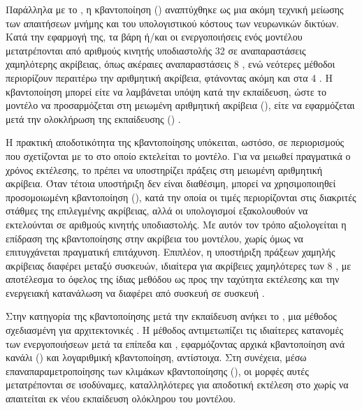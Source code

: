 Παράλληλα με το , η κβαντοποίηση
() αναπτύχθηκε ως μια ακόμη τεχνική μείωσης των
απαιτήσεων μνήμης και του υπολογιστικού κόστους των νευρωνικών δικτύων.
Κατά την εφαρμογή της, τα βάρη ή/και οι ενεργοποιήσεις ενός μοντέλου
μετατρέπονται από αριθμούς κινητής υποδιαστολής 32  σε
αναπαραστάσεις χαμηλότερης ακρίβειας, όπως ακέραιες αναπαραστάσεις
8  \cite{jacob2018quantization}, ενώ νεότερες μέθοδοι
περιορίζουν περαιτέρω την αριθμητική ακρίβεια, φτάνοντας ακόμη και στα
4  \cite{li2023repqvit}. Η κβαντοποίηση μπορεί είτε να λαμβάνεται υπόψη κατά την εκπαίδευση,
ώστε το μοντέλο να προσαρμόζεται στη μειωμένη αριθμητική ακρίβεια
(), είτε να εφαρμόζεται μετά την
ολοκλήρωση της εκπαίδευσης ()
\cite{gholami2021survey}.

Η πρακτική αποδοτικότητα της κβαντοποίησης υπόκειται, ωστόσο, σε
περιορισμούς που σχετίζονται με το  στο οποίο εκτελείται
το μοντέλο. Για να μειωθεί πραγματικά ο χρόνος εκτέλεσης, το
 πρέπει να υποστηρίζει πράξεις στη μειωμένη αριθμητική
ακρίβεια. Όταν τέτοια υποστήριξη δεν είναι διαθέσιμη, μπορεί να
χρησιμοποιηθεί προσομοιωμένη κβαντοποίηση
(), κατά την οποία οι τιμές περιορίζονται
στις διακριτές στάθμες της επιλεγμένης ακρίβειας, αλλά οι υπολογισμοί
εξακολουθούν να εκτελούνται σε αριθμούς κινητής υποδιαστολής. Με αυτόν
τον τρόπο αξιολογείται η επίδραση της κβαντοποίησης στην ακρίβεια του
μοντέλου, χωρίς όμως να επιτυγχάνεται πραγματική επιτάχυνση. Επιπλέον,
η υποστήριξη πράξεων χαμηλής ακρίβειας διαφέρει μεταξύ συσκευών,
ιδιαίτερα για ακρίβειες χαμηλότερες των 8 , με αποτέλεσμα το
όφελος της ίδιας μεθόδου ως προς την ταχύτητα εκτέλεσης και την
ενεργειακή κατανάλωση να διαφέρει από συσκευή σε συσκευή
\cite{gholami2021survey}.

Στην κατηγορία της κβαντοποίησης μετά την εκπαίδευση ανήκει το
 \cite{li2023repqvit}, μια μέθοδος σχεδιασμένη για
αρχιτεκτονικές . Η μέθοδος αντιμετωπίζει τις
ιδιαίτερες κατανομές των ενεργοποιήσεων μετά τα επίπεδα 
και , εφαρμόζοντας αρχικά κβαντοποίηση ανά κανάλι
() και λογαριθμική κβαντοποίηση,
αντίστοιχα. Στη συνέχεια, μέσω επαναπαραμετροποίησης των κλιμάκων
κβαντοποίησης (), οι μορφές αυτές 
μετατρέπονται σε ισοδύναμες, καταλληλότερες για αποδοτική εκτέλεση στο 
χωρίς να απαιτείται εκ νέου εκπαίδευση ολόκληρου του μοντέλου.



